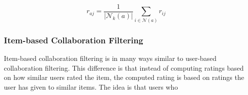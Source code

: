 \begin{equation}
	r_{aj}=\frac{1}{|\mathcal{N}_{k}(a)|}\sum_{i\in\mathcal{N}(a)}r_{ij}
\end{equation}





\subsubsection{Item-based Collaboration Filtering}
\label{subsubsec:item_based_cf}

Item-based collaboration filtering is in many ways similar to user-based collaboration filtering.
This difference is that instead of computing ratings based on how similar users rated the item, the computed rating is based on ratings the user has given to similar items.
The idea is that users who 
